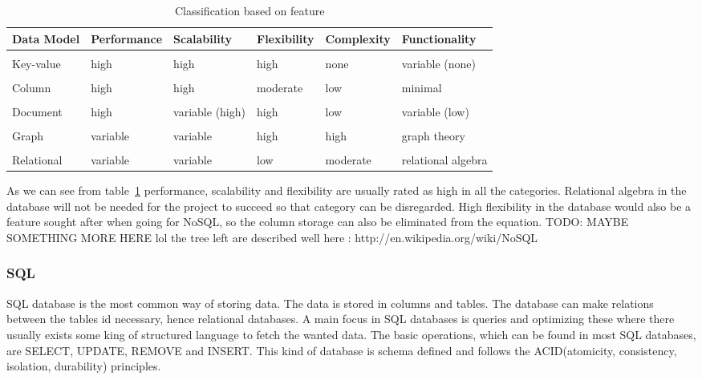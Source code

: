 \begin{table}
\centering
\begin{adjustwidth}{-2cm}{}
\begin{tabularx}{1.3\textwidth}{  l l l l l l }
  \textbf{Data Model} & \textbf{Performance} & \textbf{Scalability} & \textbf{Flexibility} & \textbf{Complexity} & \textbf{Functionality}\\
  \hline \\ [-1.5ex]
  Key-value & high      & high              & high      & none      & variable (none)\\
  \hline \\ [-1.5ex]
  Column    & high      & high              & moderate  & low       & minimal \\
  \hline \\ [-1.5ex]
  Document  & high      & variable (high)   & high      & low       & variable (low)\\
  \hline \\ [-1.5ex]
  Graph     & variable  & variable          & high      & high      & graph theory \\
  \hline \\ [-1.5ex]
  Relational & variable & variable          & low       & moderate  & relational algebra\\
\end{tabularx}
\end{adjustwidth}
\caption{Classification based on feature}
\label{table:nosql-calssifications}
\end{table}
As we can see from table~\ref{table:nosql-calssifications} performance, scalability and flexibility are usually rated as high in all the categories. Relational algebra in the database will not be needed for the project to succeed so that category can be disregarded. High flexibility in the database would also be a feature sought after when going for NoSQL, so the column storage can also be eliminated from the equation. TODO: MAYBE SOMETHING MORE HERE lol the tree left are described well here : http://en.wikipedia.org/wiki/NoSQL
\cite{nosql-databases, nosql-article}


\subsubsection*{SQL}
SQL database is the most common way of storing data. The data is stored in columns and tables. The database can make relations between the tables id necessary, hence relational databases. A main focus in SQL databases is queries and optimizing these where there usually exists some king of structured language to fetch the wanted data. The basic operations, which can be found in most SQL databases, are SELECT, UPDATE, REMOVE and INSERT. This kind of database is schema defined and follows the ACID(atomicity, consistency, isolation, durability) principles.
\cite{ramakrishnan2003database}




